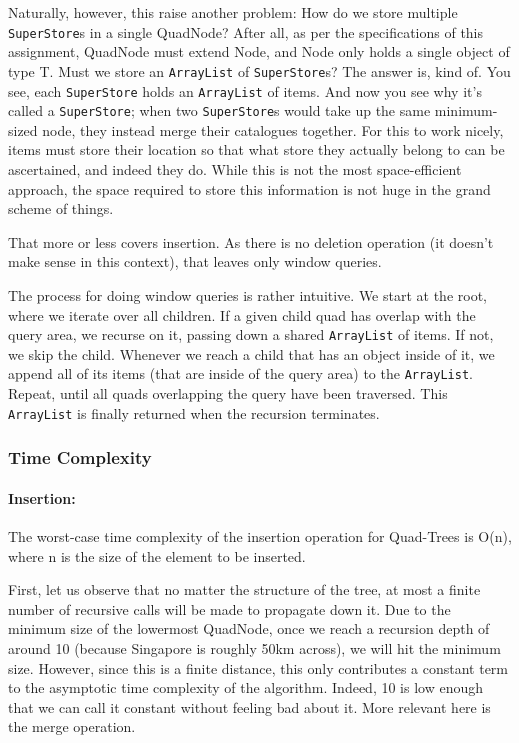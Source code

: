 \documentclass[12pt]{article}
\begin{document}
{Naturally, however, this raise another problem: How do we store multiple \texttt{SuperStore}s in a single QuadNode? After all, as per the specifications of this assignment, QuadNode must extend Node, and Node only holds a single object of type T. Must we store an \texttt{ArrayList} of \texttt{SuperStore}s? The answer is, kind of. You see, each \texttt{SuperStore} holds an \texttt{ArrayList} of items. And now you see why it's called a \texttt{SuperStore}; when two \texttt{SuperStore}s would take up the same minimum-sized node, they instead merge their catalogues together. For this to work nicely, items must store their location so that what store they actually belong to can be ascertained, and indeed they do. While this is not the most space-efficient approach, the space required to store this information is not huge in the grand scheme of things.

That more or less covers insertion. As there is no deletion operation (it doesn't make sense in this context), that leaves only window queries.

The process for doing window queries is rather intuitive. We start at the root, where we iterate over all children. If a given child quad has overlap with the query area, we recurse on it, passing down a shared \texttt{ArrayList} of items. If not, we skip the child. Whenever we reach a child that has an object inside of it, we append all of its items (that are inside of the query area) to the \texttt{ArrayList}. Repeat, until all quads overlapping the query have been traversed. This \texttt{ArrayList} is finally returned when the recursion terminates.

\subsubsection{Time Complexity}

\paragraph{Insertion:} 

The worst-case time complexity of the insertion operation for Quad-Trees is O(n), where n is the size of the element to be inserted.

First, let us observe that no matter the structure of the tree, at most a finite number of recursive calls will be made to propagate down it. Due to the minimum size of the lowermost QuadNode, once we reach a recursion depth of around 10 (because Singapore is roughly 50km across), we will hit the minimum size. However, since this is a finite distance, this only contributes a constant term to the asymptotic time complexity of the algorithm. Indeed, 10 is low enough that we can call it constant without feeling bad about it. More relevant here is the merge operation.

}
\end{document}
